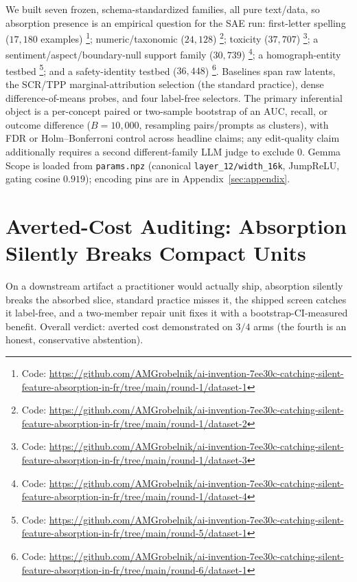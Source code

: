 \documentclass[11pt,letterpaper]{article}
\begin{document}
We built seven frozen, schema-standardized families, all pure text/data, so absorption presence is an empirical question for the SAE run: first-letter spelling ($17{,}180$ examples) \footnote{Code: \url{https://github.com/AMGrobelnik/ai-invention-7ee30c-catching-silent-feature-absorption-in-fr/tree/main/round-1/dataset-1}}; numeric/taxonomic ($24{,}128$) \footnote{Code: \url{https://github.com/AMGrobelnik/ai-invention-7ee30c-catching-silent-feature-absorption-in-fr/tree/main/round-1/dataset-2}}; toxicity ($37{,}707$) \footnote{Code: \url{https://github.com/AMGrobelnik/ai-invention-7ee30c-catching-silent-feature-absorption-in-fr/tree/main/round-1/dataset-3}}; a sentiment/aspect/boundary-null support family ($30{,}739$) \footnote{Code: \url{https://github.com/AMGrobelnik/ai-invention-7ee30c-catching-silent-feature-absorption-in-fr/tree/main/round-1/dataset-4}}; a homograph-entity testbed \footnote{Code: \url{https://github.com/AMGrobelnik/ai-invention-7ee30c-catching-silent-feature-absorption-in-fr/tree/main/round-5/dataset-1}}; and a safety-identity testbed ($36{,}448$) \footnote{Code: \url{https://github.com/AMGrobelnik/ai-invention-7ee30c-catching-silent-feature-absorption-in-fr/tree/main/round-6/dataset-1}}. Baselines span raw latents, the SCR/TPP marginal-attribution selection (the standard practice), dense difference-of-means probes, and four label-free selectors. The primary inferential object is a per-concept paired or two-sample bootstrap of an AUC, recall, or outcome difference ($B{=}10{,}000$, resampling pairs/prompts as clusters), with FDR or Holm--Bonferroni control across headline claims; any edit-quality claim additionally requires a second different-family LLM judge to exclude $0$. Gemma Scope is loaded from \texttt{params.npz} (canonical \texttt{layer\_12/}\allowbreak\texttt{width\_16k}, JumpReLU, gating cosine $0.919$); encoding pins are in Appendix~\ref{sec:appendix}.

\section{Averted-Cost Auditing: Absorption Silently Breaks Compact Units}
\label{sec:averted}

On a downstream artifact a practitioner would actually ship, absorption silently breaks the absorbed slice, standard practice misses it, the shipped screen catches it label-free, and a two-member repair unit fixes it with a bootstrap-CI-measured benefit. Overall verdict: averted cost demonstrated on $3/4$ arms (the fourth is an honest, conservative abstention).
\end{document}
